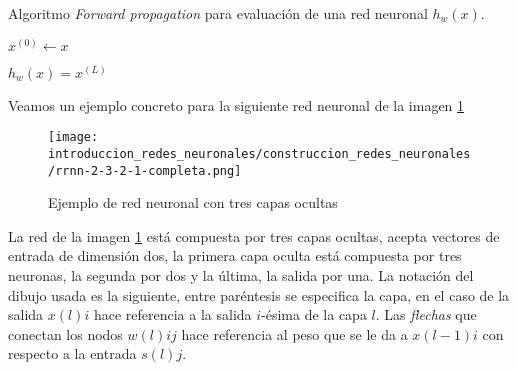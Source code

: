 \begin{algorithm}[H]
    \caption{Algoritmo \textit{Forward propagation} para evaluación de una red neuronal $h_w(x)$.}
    \begin{algorithmic}[1]
        \STATE $x^{(0)} \leftarrow x$ 

        \STATE {}
        \STATE $h_w(x) = x^{(L)}$ 
\end{algorithmic}
\end{algorithm}

Veamos un ejemplo concreto para la siguiente red neuronal de la imagen \ref{img:construccion_rrnn:rrnn-2-3-2-1}
\begin{figure}[h!]
    \texttt{[image: introduccion\_redes\_neuronales/construccion\_redes\_neuronales/rrnn-2-3-2-1-completa.png]}
    \caption{Ejemplo de red neuronal con tres capas ocultas}
    \label{img:construccion_rrnn:rrnn-2-3-2-1}
\end{figure} 

La red de la imagen \ref{img:construccion_rrnn:rrnn-2-3-2-1} está 
compuesta por tres capas ocultas, acepta vectores de entrada de dimensión dos, 
la primera capa oculta está compuesta por tres neuronas, 
la segunda por dos y la última, la salida por una. 
La notación del dibujo usada es la siguiente, entre paréntesis se 
especifica la capa, en el caso de la salida $x(l)i$ hace referencia a la salida $i$-ésima de la capa $l$. Las \textit{flechas} que conectan los nodos $w(l)ij$ hace referencia al peso que se le da a $x(l-1)i$ con respecto a la entrada $s(l)j$.

